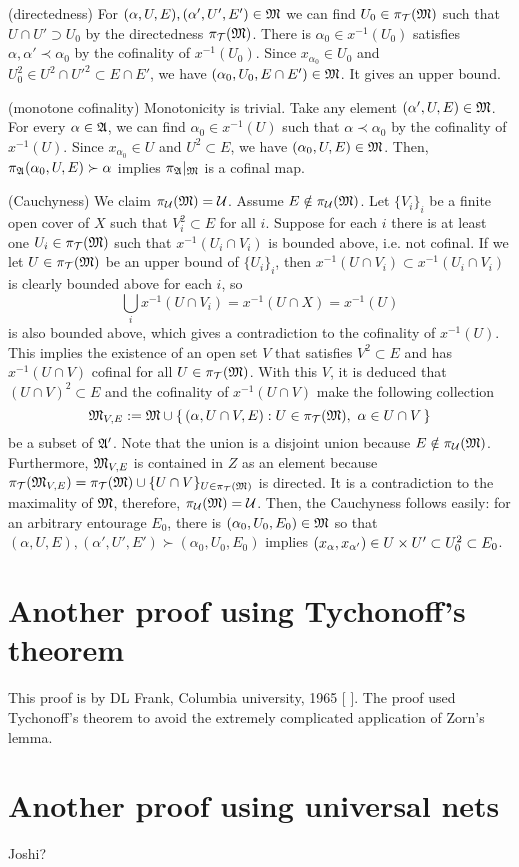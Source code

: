 \documentclass{../exp}
\begin{document}
\begin{pf}[1 of Theorem 1.1]
(directedness)
For $(\alpha,U,E),(\alpha',U',E')\in\mathfrak{M}$ we can find $U_0\in\pi_{\mathcal{T}}(\mathfrak{M})$ such that $U\cap U'\supset U_0$ by the directedness $\pi_{\mathcal{T}}(\mathfrak{M})$.
There is $\alpha_0\in x^{-1}(U_0)$ satisfies $\alpha,\alpha'\prec\alpha_0$ by the cofinality of $x^{-1}(U_0)$.
Since $x_{\alpha_0}\in U_0$ and $U_0^2\in U^2\cap U'^2\subset E\cap E'$, we have $(\alpha_0,U_0,E\cap E')\in\mathfrak{M}$.
It gives an upper bound.

(monotone cofinality)
Monotonicity is trivial.
Take any element $(\alpha',U,E)\in\mathfrak{M}$.
For every $\alpha\in\mathfrak{A}$, we can find $\alpha_0\in x^{-1}(U)$ such that $\alpha\prec\alpha_0$ by the cofinality of $x^{-1}(U)$.
Since $x_{\alpha_0}\in U$ and $U^2\subset E$, we have $(\alpha_0,U,E)\in\mathfrak{M}$.
Then, $\pi_{\mathfrak{A}}(\alpha_0,U,E)\succ\alpha$ implies $\pi_{\mathfrak{A}}|_{\mathfrak{M}}$ is a cofinal map.

(Cauchyness)
We claim $\pi_{\mathcal{U}}(\mathfrak{M})=\mathcal{U}$.
Assume $E\notin\pi_{\mathcal{U}}(\mathfrak{M})$.
Let $\{V_i\}_i$ be a finite open cover of $X$ such that $V_i^2\subset E$ for all $i$.
Suppose for each $i$ there is at least one $U_i\in\pi_{\mathcal{T}}(\mathfrak{M})$ such that $x^{-1}(U_i\cap V_i)$ is bounded above, i.e. not cofinal.
If we let $U\in\pi_{\mathcal{T}}(\mathfrak{M})$ be an upper bound of $\{U_i\}_i$, then $x^{-1}(U\cap V_i)\subset x^{-1}(U_i\cap V_i)$ is clearly bounded above for each $i$, so
\[\bigcup_ix^{-1}(U\cap V_i)=x^{-1}(U\cap X)=x^{-1}(U)\]
is also bounded above, which gives a contradiction to the cofinality of $x^{-1}(U)$.
This implies the existence of an open set $V$ that satisfies $V^2\subset E$ and has $x^{-1}(U\cap V)$ cofinal for all $U\in\pi_{\mathcal{T}}(\mathfrak{M})$.
With this $V$, it is deduced that $(U\cap V)^2\subset E$ and the cofinality of $x^{-1}(U\cap V)$ make the following collection
\[\mathfrak{M}_{V,E}:=\mathfrak{M}\cup\{\,(\alpha,U\cap V,E):U\in\pi_{\mathcal{T}}(\mathfrak{M}),\ \alpha\in U\cap V\,\}\]
be a subset of $\mathfrak{A}'$.
Note that the union is a disjoint union because $E\notin\pi_{\mathcal{U}}(\mathfrak{M})$.
Furthermore, $\mathfrak{M}_{V,E}$ is contained in $Z$ as an element because $\pi_{\mathcal{T}}(\mathfrak{M}_{V,E})=\pi_{\mathcal{T}}(\mathfrak{M})\cup\{U\cap V\}_{U\in\pi_{\mathcal{T}}(\mathfrak{M})}$ is directed.
It is a contradiction to the maximality of $\mathfrak{M}$, therefore, $\pi_{\mathcal{U}}(\mathfrak{M})=\mathcal{U}$.
Then, the Cauchyness follows easily: for an arbitrary entourage $E_0$, there is $(\alpha_0,U_0,E_0)\in\mathfrak{M}$ so that $(\alpha,U,E),(\alpha',U',E')\succ(\alpha_0,U_0,E_0)$ implies $(x_\alpha,x_{\alpha'})\in U\times U'\subset U_0^2\subset E_0$.
\end{pf}







\section{Another proof using Tychonoff's theorem}
This proof is by DL Frank, Columbia university, 1965 [ ].
The proof used Tychonoff's theorem to avoid the extremely complicated application of Zorn's lemma.

\begin{pf}[2 of Theorem 1.1]

\end{pf}


\section{Another proof using universal nets}
Joshi?
\end{document}
